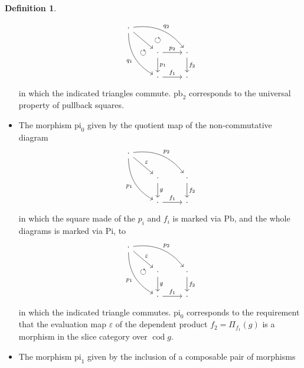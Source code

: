 \documentclass[a4paper]{article}
\theoremstyle{remark}
\theoremstyle{definition}
\newtheorem{definition}[theorem]{Definition}
\begin{document}
\begin{definition}
\begin{itemize}
\begin{equation}
        \begin{tikzcd}
          \cdot \arrow[ddr, bend right, "q_1"'] \arrow[ddr, phantom, "\circlearrowleft"] \arrow[drr, bend left, "q_2"] \arrow[drr, phantom, "\circlearrowleft"] \arrow[dr] \\
          & \cdot \arrow[d, "p_1"] \arrow[r, "p_2"] & \cdot \arrow[d, "f_2"] \\
          & \cdot \arrow[r, "f_1"] & \cdot
        \end{tikzcd}
      \end{equation}
      in which the indicated triangles commute.
      $\mathrm{pb}_2$ corresponds to the universal property of pullback squares.
    \item
      The morphism $\mathrm{pi}_0$ given by the quotient map of the non-commutative diagram
      \begin{equation}
        \begin{tikzcd}
          \cdot \arrow[ddr, bend right, "p_1"'] \arrow[drr, bend left, "p_2"] \arrow[dr, "\varepsilon"] \\
          & \cdot \arrow[d, "g"] & \cdot \arrow[d, "f_2"] \\
          & \cdot \arrow[r, "f_1"] & \cdot
        \end{tikzcd}
      \end{equation}
      in which the square made of the $p_i$ and $f_i$ is marked via $\mathrm{Pb}$, and the whole diagrams is marked via $\mathrm{Pi}$, to
      \begin{equation}
        \begin{tikzcd}
          \cdot \arrow[ddr, bend right, "p_1"'] \arrow[ddr, phantom, "\circlearrowleft"] \arrow[drr, bend left, "p_2"] \arrow[dr, "\varepsilon"] \\
          & \cdot \arrow[d, "g"] & \cdot \arrow[d, "f_2"] \\
          & \cdot \arrow[r, "f_1"] & \cdot
        \end{tikzcd}
      \end{equation}
      in which the indicated triangle commutes.
      $\mathrm{pi}_0$ corresponds to the requirement that the evaluation map $\varepsilon$ of the dependent product $f_2 = \Pi_{f_1}(g)$ is a morphism in the slice category over $\operatorname{cod} g$.
    \item
      The morphism $\mathrm{pi}_1$ given by the inclusion of a composable pair of morphisms
      \begin{equation}
        \begin{tikzcd}

\end{tikzcd}
\end{equation}
\end{itemize}
\end{definition}
\end{document}
